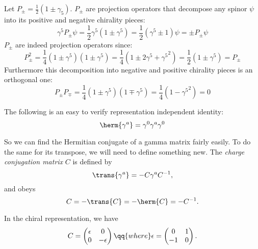 \documentclass{jknotes} %
\begin{document}
Let \(P_\pm = \frac{1}{2}(1\pm\gamma_5)\). \(P_\pm\) are projection operators that decompose any spinor \(\psi\) into its positive and negative chirality pieces:
\begin{equation}
    \gamma^5P_\pm\psi = \frac{1}{2}\gamma^5(1\pm\gamma^5) = \frac{1}{2}(\gamma^5\pm1)\psi = \pm P_\pm\psi
\end{equation}
\(P_\pm\) are indeed projection operators since:
\begin{equation}
    P_\pm^2 = \frac{1}{4}(1\pm\gamma^5)(1\pm\gamma^5) = \frac{1}{4}(1\pm2\gamma^5 + {\gamma^5}^2) = \frac{1}{2}(1\pm\gamma^5) = P_\pm
\end{equation}
Furthermore this decomposition into negative and positive chirality pieces is an orthogonal one:
\begin{equation}
    P_\pm P_\mp = \frac{1}{4}(1\pm\gamma^5)(1\mp\gamma^5) = \frac{1}{4}(1-{\gamma^5}^2) = 0
\end{equation}

The following is an easy to verify representation independent identity:
\begin{equation}
    \herm{\gamma^a} = \gamma^0\gamma^a\gamma^0
\end{equation}

So we can find the Hermitian conjugate of a gamma matrix fairly easily. To do the same for its transpose, we will need to define something new. The \emph{charge conjugation matrix} \(C\) is defined by
\begin{equation}
    \trans{\gamma^a} = -C\gamma^aC^{-1},
\end{equation}
and obeys
\begin{equation}
    C = -\trans{C}=-\herm{C} = -C^{-1}.
\end{equation}

In the chiral representation, we have
\begin{equation}
    C = 
    \begin{pmatrix}
        \epsilon & 0 \\ 0 & -\epsilon
    \end{pmatrix}
    \qq{where}
    \epsilon = 
    \begin{pmatrix}
        0 & 1 \\ -1 & 0
    \end{pmatrix}.
\end{equation}
\end{document}
